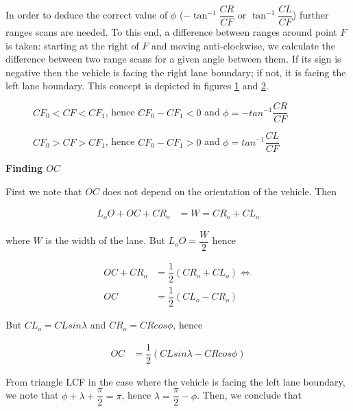 In order to deduce the correct value of $\phi$ ($-\tan^{-1}\dfrac{CR}{CF}$ or
$\tan^{-1}\dfrac{CL}{CF}$) further ranges scans are needed. To this end,
a difference between ranges around point $F$ is taken: starting at the
right of $F$ and moving anti-clockwise, we calculate the difference between
two range scans for a given angle between them. If its sign
is negative then the vehicle is facing the right lane boundary; if not,
it is facing the left lane boundary. This concept is depicted in figures
\ref{fig:range_mpc_diff_negative} and  \ref{fig:range_mpc_diff_positive}.

\begin{figure}[H]\centering
  \scalebox{1}{}
  \caption{$CF_0 < CF < CF_1$, hence $CF_0 - CF_1 < 0$ and $\phi = -tan^{-1} \dfrac{CR}{CF}$}
  \label{fig:range_mpc_diff_negative}
\end{figure}

\begin{figure}[H]\centering
  \scalebox{1}{}
  \caption{$CF_0 > CF > CF_1$, hence $CF_0 - CF_1 > 0$ and $\phi = tan^{-1} \dfrac{CL}{CF}$}
  \label{fig:range_mpc_diff_positive}
\end{figure}


\textbf{Finding $OC$}

First we note that $OC$ does not depend on the orientation of the vehicle. Then

\begin{align}
  L_o O + OC + CR_o &= W = CR_o + CL_o
\end{align}

where $W$ is the width of the lane. But $L_o O = \dfrac{W}{2}$ hence

\begin{align}
  OC + CR_o &= \dfrac{1}{2}(CR_o + CL_o) \Leftrightarrow \\
  OC &= \dfrac{1}{2}(CL_o - CR_o)
\end{align}

But $CL_o = CL sin\lambda$ and $CR_o = CR cos\phi$, hence


\begin{align}
  OC &= \dfrac{1}{2}(CL sin\lambda - CR cos\phi)
\end{align}

From triangle LCF in the case where the vehicle is facing the left lane boundary,
we note that $\phi + \lambda + \dfrac{\pi}{2} = \pi$,
hence $\lambda = \dfrac{\pi}{2} - \phi$. Then, we conclude that

